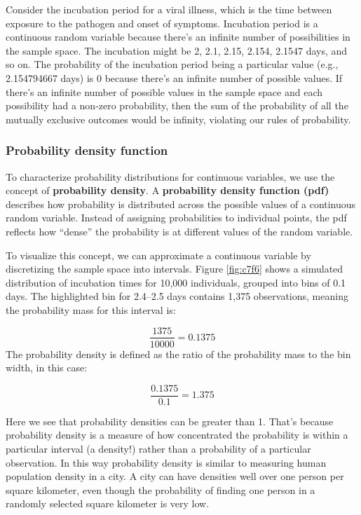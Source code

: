 \documentclass[
]{book}
\begin{document}
Consider the incubation period for a viral illness, which is the time between exposure to the pathogen and onset of symptoms. Incubation period is a continuous random variable because there's an infinite number of possibilities in the sample space. The incubation might be 2, 2.1, 2.15, 2.154, 2.1547 days, and so on. The probability of the incubation period being a particular value (e.g., 2.154794667 days) is 0 because there's an infinite number of possible values. If there's an infinite number of possible values in the sample space and each possibility had a non-zero probability, then the sum of the probability of all the mutually exclusive outcomes would be infinity, violating our rules of probability.

\subsubsection{Probability density function}\label{probability-density-function}

To characterize probability distributions for continuous variables, we use the concept of \textbf{probability density}. A \textbf{probability density function (pdf)} describes how probability is distributed across the possible values of a continuous random variable. Instead of assigning probabilities to individual points, the pdf reflects how ``dense'' the probability is at different values of the random variable.

To visualize this concept, we can approximate a continuous variable by discretizing the sample space into intervals. Figure \ref{fig:c7f6} shows a simulated distribution of incubation times for 10,000 individuals, grouped into bins of 0.1 days. The highlighted bin for 2.4--2.5 days contains 1,375 observations, meaning the probability mass for this interval is:

\[
\frac{1375}{10000}=0.1375
\]
The probability density is defined as the ratio of the probability mass to the bin width, in this case:

\[
\frac{0.1375}{0.1}=1.375
\]

Here we see that probability densities can be greater than 1. That's because probability density is a measure of how concentrated the probability is within a particular interval (a density!) rather than a probability of a particular observation. In this way probability density is similar to measuring human population density in a city. A city can have densities well over one person per square kilometer, even though the probability of finding one person in a randomly selected square kilometer is very low.
\end{document}
